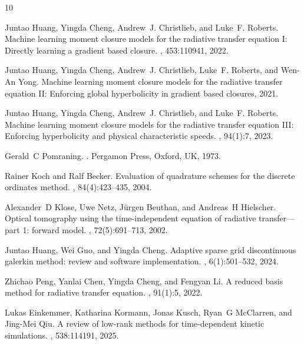 \documentclass[11pt]{article}
\numberwithin{equation}{section}
\begin{document}
\begin{thebibliography}{10}

Juntao Huang, Yingda Cheng, Andrew~J. Christlieb, and Luke~F. Roberts.
\newblock Machine learning moment closure models for the radiative transfer
  equation {I}: Directly learning a gradient based closure.
, 453:110941, 2022.

Juntao Huang, Yingda Cheng, Andrew~J. Christlieb, Luke~F. Roberts, and Wen-An
  Yong.
\newblock Machine learning moment closure models for the radiative transfer
  equation {II}: Enforcing global hyperbolicity in gradient based closures,
  2021.

Juntao Huang, Yingda Cheng, Andrew~J. Christlieb, and Luke~F. Roberts.
\newblock Machine learning moment closure models for the radiative transfer
  equation {III}: Enforcing hyperbolicity and physical characteristic speeds.
, 94(1):7, 2023.

Gerald~C Pomraning.
.
\newblock Pergamon Press, Oxford, UK, 1973.

Rainer Koch and Ralf Becker.
\newblock Evaluation of quadrature schemes for the discrete ordinates method.
,
  84(4):423--435, 2004.

Alexander~D Klose, Uwe Netz, J{\"u}rgen Beuthan, and Andreas~H Hielscher.
\newblock Optical tomography using the time-independent equation of radiative
  transfer—part 1: forward model.
,
  72(5):691--713, 2002.

Juntao Huang, Wei Guo, and Yingda Cheng.
\newblock Adaptive sparse grid discontinuous galerkin method: review and
  software implementation.
,
  6(1):501--532, 2024.

Zhichao Peng, Yanlai Chen, Yingda Cheng, and Fengyan Li.
\newblock A reduced basis method for radiative transfer equation.
, 91(1):5, 2022.

Lukas Einkemmer, Katharina Kormann, Jonas Kusch, Ryan~G McClarren, and Jing-Mei
  Qiu.
\newblock A review of low-rank methods for time-dependent kinetic simulations.
, 538:114191, 2025.


\end{thebibliography}
\end{document}
